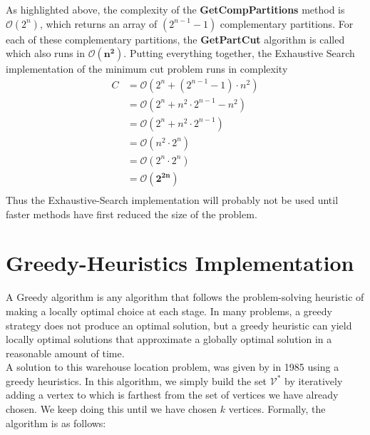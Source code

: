 \documentclass[longpaper, english, final, times]{revdetua}
\begin{document}
			As highlighted above, the complexity of the \textbf{GetCompPartitions} method is $\mathcal{O}(2^n)$, which returns an array of $(2^{n-1}-1)$ complementary partitions. For each of these complementary partitions, the \textbf{GetPartCut} algorithm is called which also runs in $\mathbf{\mathcal{O}(n^2)}$. Putting everything together, the Exhaustive Search implementation of the minimum cut problem runs in complexity
			\begin{align*}
				C & = \mathcal{O}\left(2^n + (2^{n-1}-1)\cdot n^2\right) \\
				& = \mathcal{O}\left(2^n + n^2\cdot 2^{n-1} - n^2\right) \\
				& = \mathcal{O}\left(2^n + n^2\cdot 2^{n-1}\right) \\
				& = \mathcal{O}\left(n^2\cdot 2^{n}\right)\\
				& = \mathcal{O}\left(2^n\cdot 2^{n}\right)\\
				& = \mathbf{\mathcal{O}\left(2^{2n}\right)} \\
			\end{align*}
			Thus the Exhaustive-Search implementation will probably not be used until faster methods have first reduced the size of the problem.
		
	\section{\label{outline:greedy} Greedy-Heuristics Implementation}
		A Greedy algorithm is any algorithm that follows the problem-solving heuristic of making a locally optimal choice at each stage.\cite{black2012greedy} In many problems, a greedy strategy does not produce an optimal solution, but a greedy heuristic can yield locally optimal solutions that approximate a globally optimal solution in a reasonable amount of time.\\
		
		A solution to this warehouse location problem, was given
		by \cite{GONZALEZ1985293} in 1985 using a greedy heuristics. In this algorithm, we simply build the set $\mathcal{V^{*}}$ by iteratively adding a vertex to which is farthest from the set of vertices we have already chosen. We keep doing this until
		we have chosen $k$ vertices. Formally, the algorithm is as follows:
		
\end{document}
